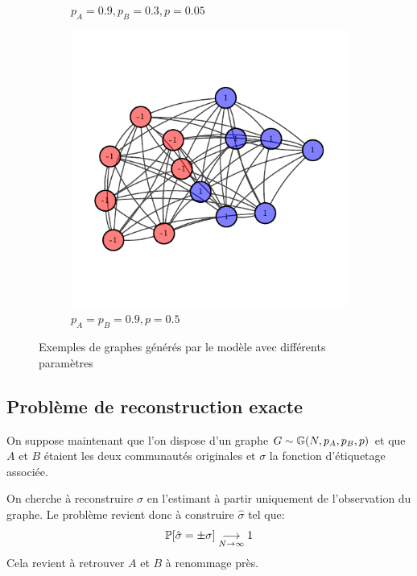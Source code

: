 \documentclass{standalone}
\begin{document}
\begin{figure}[H]
\begin{subfigure}{0.3\textwidth}
			\caption{$p_A = 0.9, p_B = 0.3, p=0.05$}
		\end{subfigure}
		\begin{subfigure}{0.3\textwidth}
			\includegraphics[scale=0.5]{ig-plots/tmp/large_largenoise.pdf}
			\caption{$p_A = p_B = 0.9, p=0.5$}
		\end{subfigure}
		
		
		
		\caption{Exemples de graphes générés par le modèle avec différents paramètres}
	\end{figure}

\subsection{Problème de reconstruction exacte}

	On suppose maintenant que l'on dispose d'un graphe $G \sim \mathbb G(N, p_A, p_B, p)$ et que $A$ et $B$ étaient les deux communautés originales et $\sigma$ la fonction d'étiquetage associée.
	
	\begin{defn}
		On cherche à reconstruire $\sigma$ en l'estimant à partir uniquement de l'observation du graphe. Le problème revient donc à construire $\hat{\sigma}$ tel que:
		\[ \mathbb P[\hat{\sigma} = \pm \sigma] \underset{N \rightarrow \infty}{\longrightarrow} 1
		\]
		Cela revient à retrouver $A$ et $B$ à renommage près.
	\end{defn}
\end{document}
